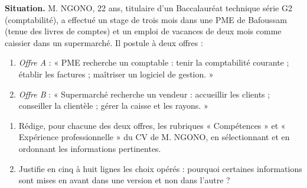 \documentclass[11pt]{article}
\begin{document}
\begin{exercice}
\textbf{Situation.} M. NGONO, 22 ans, titulaire d'un Baccalauréat technique série G2 (comptabilité), a effectué un stage de trois mois dans une PME de Bafoussam (tenue des livres de comptes) et un emploi de vacances de deux mois comme caissier dans un supermarché. Il postule à deux offres :
\begin{enumerate}
\item \emph{Offre A} : « PME recherche un comptable : tenir la comptabilité courante ; établir les factures ; maîtriser un logiciel de gestion. »
\item \emph{Offre B} : « Supermarché recherche un vendeur : accueillir les clients ; conseiller la clientèle ; gérer la caisse et les rayons. »
\end{enumerate}

\begin{enumerate}
\item Rédige, pour chacune des deux offres, les rubriques « Compétences » et « Expérience professionnelle » du CV de M. NGONO, en sélectionnant et en ordonnant les informations pertinentes.
\item Justifie en cinq à huit lignes les choix opérés : pourquoi certaines informations sont mises en avant dans une version et non dans l'autre ?
\end{enumerate}
\end{exercice}
\end{document}
